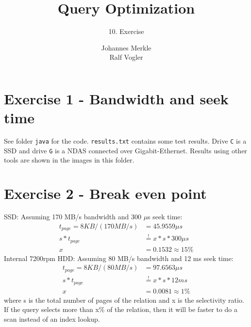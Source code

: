 \documentclass[11pt,a4paper]{scrartcl}
\begin{document}
\author{Johannes Merkle\\Ralf Vogler}
\title{Query Optimization}
\subtitle{10. Exercise}

\maketitle

\section*{Exercise 1 - Bandwidth and seek time}
See folder \verb|java| for the code. \verb|results.txt| contains some test results. Drive \verb|C| is a SSD and drive \verb|G| is a NDAS connected over Gigabit-Ethernet. Results using other tools are shown in the images in this folder.

%


\section*{Exercise 2 - Break even point}
SSD: Assuming 170 MB/s bandwidth and 300 $\mu$s seek time:
\begin{align*}
t_{page} = 8KB / (170 MB/s) &= 45.9559 \mu s\\
s * t_{page} &\stackrel{!}{=} x * s * 300\mu s\\
x &= 0.1532 \approx 15\%
\end{align*}
Internal 7200rpm HDD: Assuming 80 MB/s bandwidth and 12 ms seek time:
\begin{align*}
t_{page} = 8KB / (80 MB/s) &= 97.6563 \mu s\\
s * t_{page} &\stackrel{!}{=} x * s * 12ms\\
x &= 0.0081 \approx 1\%
\end{align*}
where s is the total number of pages of the relation and x is the selectivity ratio.
If the query selects more than x\% of the relation, then it will be faster to do a scan instead of an index lookup.
\end{document}
